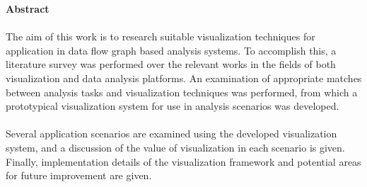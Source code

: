\begin{center}
\textbf{Abstract}
\end{center}

\paragraph{}
The aim of this work is to research suitable visualization techniques for application in data flow graph based analysis systems. To accomplish this, a literature survey was performed over the relevant works in the fields of both visualization and data analysis platforms. An examination of appropriate matches between analysis tasks and visualization techniques was performed, from which a prototypical visualization system for use in analysis scenarios was developed.

\paragraph{}
Several application scenarios are examined using the developed visualization system, and a discussion of the value of visualization in each scenario is given. Finally, implementation details of the visualization framework and potential areas for future improvement are given.

\bigskip
